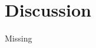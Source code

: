 \documentclass[paper=a4, fontsize=11pt,parskip=half,headings=small]{scrartcl}
\begin{document}
	
	
	\section{Discussion}\label{sec:conclusion}
	Missing
	
		
	

	
\end{document}

